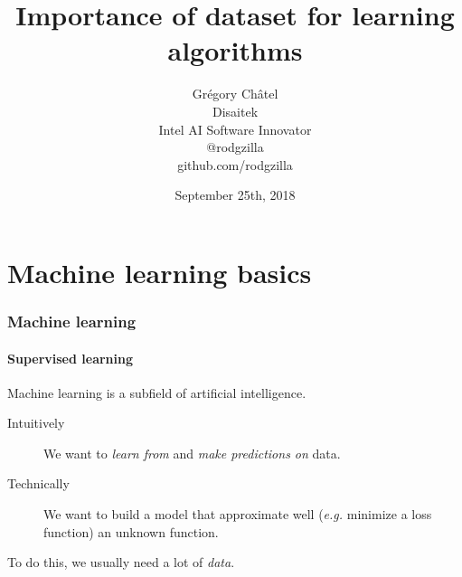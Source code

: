 \documentclass[9pt]{beamer}
\title{Importance of dataset for learning algorithms}
\author[G. Châtel]{Grégory Châtel\\\vspace{0.3cm}Disaitek\\Intel AI Software Innovator\\\vspace{0.3cm}@rodgzilla\\github.com/rodgzilla}
\date{September 25th, 2018}
\begin{document}
\begin{frame}

  \maketitle

\end{frame}

\begin{frame}

  \tableofcontents

\end{frame}

\section{Machine learning basics}

\begin{frame}

  \frametitle{Machine learning}

  \framesubtitle{Supervised learning}

  Machine learning is a subfield of artificial intelligence.

  \bigskip

  \begin{description}
    \item[Intuitively] We want to \emph{learn from} and \emph{make predictions
    on} data.

    \medskip

    \item[Technically] We want to build a model that approximate well
      (\textit{e.g.} minimize a loss function) an unknown function.
  \end{description}

  \bigskip

  To do this, we usually need a lot of \emph{data}.

\end{frame}

\begin{frame}

\end{frame}
\end{document}
